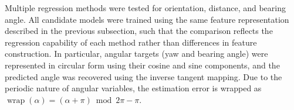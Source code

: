 \documentclass[subscriptcorrection,upint,varvw,barcolor=Goldenrod3,mathalfa=cal=euler,balance,hyphenate,pdf-a]{asmejour}
\begin{document}
Multiple regression methods were tested for orientation, distance, and bearing angle. All candidate models were trained using the same feature representation described in the previous subsection, such that the comparison reflects the regression capability of each method rather than differences in feature construction. In particular, angular targets (yaw and bearing angle) were represented in circular form using their cosine and sine components, and the predicted angle was recovered using the inverse tangent mapping. Due to the periodic nature of angular variables, the estimation error is wrapped as $\operatorname{wrap}(\alpha) = (\alpha+\pi)\bmod 2\pi-\pi$.
\end{document}
